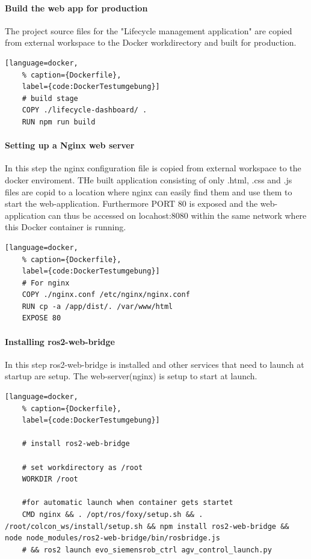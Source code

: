 \paragraph*{Build the web app for production} The project source files for the "Lifecycle management application" are copied from external workspace to the Docker workdirectory and built for production.
\begin{lstlisting}[language=docker,
	% caption={Dockerfile}, 
	label={code:DockerTestumgebung}]
	# build stage
	COPY ./lifecycle-dashboard/ .
	RUN npm run build
\end{lstlisting}

\paragraph{Setting up a Nginx web server} In this step the nginx configuration file is copied from external workspace to the docker enviroment. THe built application consisting of only .html, .css and .js files are copid to a location where nginx can easily find them and use them to start the web-application. Furthermore PORT 80 is exposed and the web-application can thus be accessed on locahost:8080 within the same network where this Docker container is running.
\begin{lstlisting}[language=docker,
	% caption={Dockerfile}, 
	label={code:DockerTestumgebung}]
	# For nginx
	COPY ./nginx.conf /etc/nginx/nginx.conf
	RUN cp -a /app/dist/. /var/www/html
	EXPOSE 80
\end{lstlisting}

\paragraph*{Installing ros2-web-bridge} In this step ros2-web-bridge is installed and other services that need to launch at startup are setup. The web-server(nginx) is setup to start at launch.
\begin{lstlisting}[language=docker,
	% caption={Dockerfile}, 
	label={code:DockerTestumgebung}]
	
	# install ros2-web-bridge
	
	# set workdirectory as /root
	WORKDIR /root

	#for automatic launch when container gets startet 
	CMD nginx && . /opt/ros/foxy/setup.sh && . /root/colcon_ws/install/setup.sh && npm install ros2-web-bridge && node node_modules/ros2-web-bridge/bin/rosbridge.js 
	# && ros2 launch evo_siemensrob_ctrl agv_control_launch.py 
\end{lstlisting}

